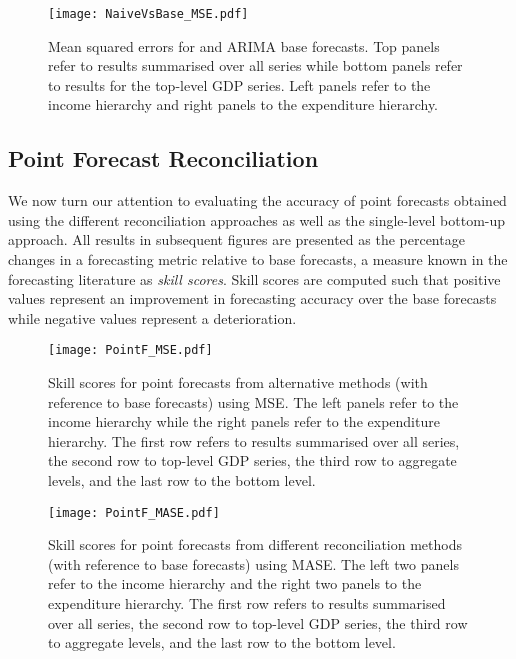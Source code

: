 {\begin{figure}
	\centering
	\small
	\texttt{[image: NaiveVsBase\_MSE.pdf]}
	\caption{Mean squared errors for \naive and ARIMA base forecasts. Top panels refer to results summarised over all series while bottom panels refer to results for the top-level GDP series. Left panels refer to the income hierarchy and right panels to the expenditure hierarchy.}\label{fig: NaiveVsBase_MSE}
\end{figure}

\subsection{Point Forecast Reconciliation}

We now turn our attention to evaluating the accuracy of point forecasts obtained using the different reconciliation approaches as well as the single-level bottom-up approach. All results in subsequent figures are presented as the percentage changes in a forecasting metric relative to base forecasts, a measure known in the forecasting literature as \emph{skill scores}. Skill scores are computed such that positive values represent an improvement in forecasting accuracy over the base forecasts while negative values represent a deterioration.

\begin{figure}
	\centering
	\small
	\texttt{[image: PointF\_MSE.pdf]}
	\caption{Skill scores for point forecasts from alternative methods (with reference to base forecasts) using MSE\@. The left panels refer to the income hierarchy while the right panels refer to the expenditure hierarchy. The first row refers to results summarised over all series, the second row to top-level GDP series, the third row to aggregate levels, and the last row to the bottom level.}
	\label{fig: PointF_MSE}
\end{figure}

\begin{figure}
	\centering
	\small
	\texttt{[image: PointF\_MASE.pdf]}
	\caption{Skill scores for point forecasts from different reconciliation methods (with reference to base forecasts) using MASE\@. The left two panels refer to the income hierarchy and the right two panels to the expenditure hierarchy. The first row refers to results summarised over all series, the second row to top-level GDP series, the third row to aggregate levels, and the last row to the bottom level.}
	\label{fig: PointF_MASE}
\end{figure}

}
